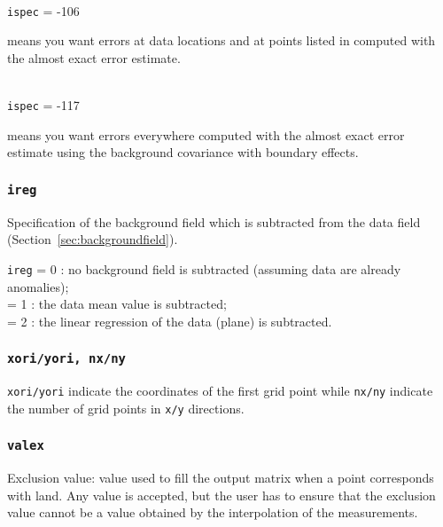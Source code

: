 \example\\
\texttt{ispec}             = -106 \qquad \begin{minipage}[t]{.7\textwidth}{means you want errors at data locations and at points listed in  computed with the almost exact error estimate.}\end{minipage}



\example\\
\texttt{ispec}             = -117 \qquad \begin{minipage}[t]{.7\textwidth}{means you want errors everywhere computed with the almost exact error estimate using the background covariance with boundary effects.}\end{minipage}






\subsubsection{\texttt{ireg}}

Specification of the background field which is subtracted from the data field (Section~\ref{sec:backgroundfield}).

\texttt{ireg}             = 0 \qquad: no background field is subtracted (assuming data are already anomalies); \\
  = 1 \qquad: the data mean value is subtracted;\\
  = 2 \qquad: the linear regression of the data (plane) is subtracted.

\subsubsection{\texttt{xori/yori, nx/ny}}

\texttt{xori/yori} indicate the coordinates of the first grid point while \texttt{nx/ny} indicate the number of grid points in \texttt{x/y} directions.



\subsubsection{\texttt{valex}}

Exclusion value: value used to fill the output matrix when a point corresponds with land. Any value is accepted, but the user has to ensure that the exclusion value cannot be a value obtained by the interpolation of the measurements. 



